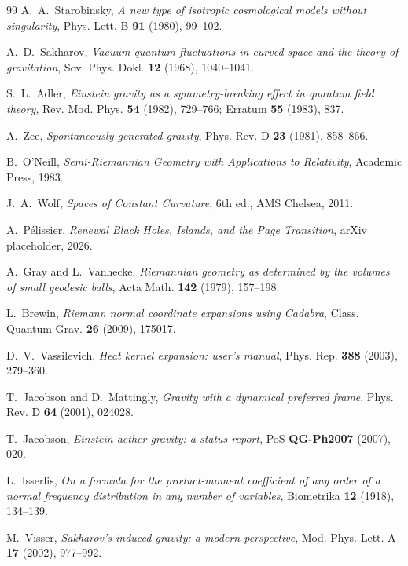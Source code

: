 \documentclass[11pt]{article}
\theoremstyle{definition}
\theoremstyle{remark}
\begin{document}
\begin{thebibliography}{99}
A.~A.~Starobinsky, \emph{A new type of isotropic cosmological models without
singularity}, Phys. Lett. B \textbf{91} (1980), 99--102.

A.~D.~Sakharov, \emph{Vacuum quantum fluctuations in curved space and the theory
of gravitation}, Sov. Phys. Dokl. \textbf{12} (1968), 1040--1041.

S.~L.~Adler, \emph{Einstein gravity as a symmetry-breaking effect in quantum
field theory}, Rev. Mod. Phys. \textbf{54} (1982), 729--766; Erratum
\textbf{55} (1983), 837.

A.~Zee, \emph{Spontaneously generated gravity}, Phys. Rev. D \textbf{23}
(1981), 858--866.

B.~O'Neill, \emph{Semi-Riemannian Geometry with Applications to Relativity},
Academic Press, 1983.

J.~A.~Wolf, \emph{Spaces of Constant Curvature}, 6th ed., AMS Chelsea, 2011.

A.~P\'elissier,
\emph{Renewal Black Holes, Islands, and the Page Transition},
arXiv placeholder, 2026.

A.~Gray and L.~Vanhecke,
\emph{Riemannian geometry as determined by the volumes of small geodesic balls},
Acta Math. \textbf{142} (1979), 157--198.

L.~Brewin,
\emph{Riemann normal coordinate expansions using Cadabra},
Class. Quantum Grav. \textbf{26} (2009), 175017.

D.~V.~Vassilevich, \emph{Heat kernel expansion: user's manual},
Phys. Rep. \textbf{388} (2003), 279--360.

T.~Jacobson and D.~Mattingly,
\emph{Gravity with a dynamical preferred frame},
Phys. Rev. D \textbf{64} (2001), 024028.

T.~Jacobson, \emph{Einstein-aether gravity: a status report},
PoS \textbf{QG-Ph2007} (2007), 020.

L.~Isserlis,
\emph{On a formula for the product-moment coefficient of any order of a normal
frequency distribution in any number of variables},
Biometrika \textbf{12} (1918), 134--139.

M.~Visser,
\emph{Sakharov's induced gravity: a modern perspective},
Mod. Phys. Lett. A \textbf{17} (2002), 977--992.


\end{thebibliography}
\end{document}
